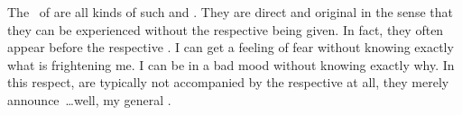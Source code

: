 \pa The \oss\ of  are all kinds of such  and
. They are direct and original
in the sense that they can be experienced without the respective 
being  given.  In fact, they often appear before the respective
.  I can get a feeling of fear without knowing exactly what is
frightening me.  I can be in a bad mood without knowing exactly why.  In this
respect,  are typically not accompanied by the respective
 at all, they merely announce~\ldots well, my general .


